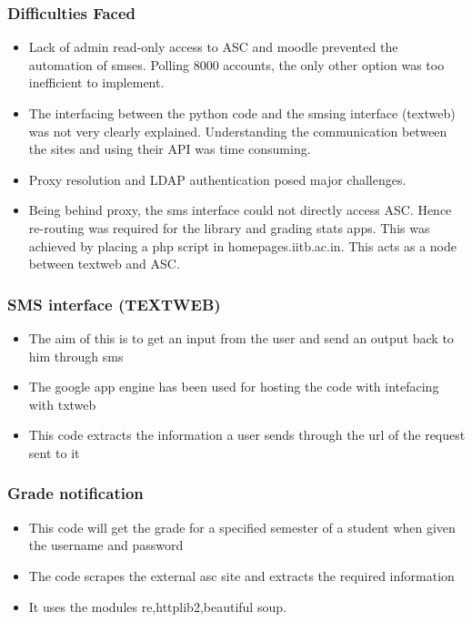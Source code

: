 \documentclass[]{beamer}
\begin{document}
\begin{frame}
	\frametitle{Difficulties Faced}   
  	\begin{itemize}
	\justifying
	\item Lack of admin read-only access to ASC and moodle prevented the automation of smses. Polling 8000 accounts, the only other option was too inefficient to implement.
	\item The interfacing between the python code and the smsing interface (textweb) was not very clearly explained. Understanding the communication between the sites and using their API was time consuming.
	\item Proxy resolution and LDAP authentication posed major challenges.
	\item Being behind proxy, the sms interface could not directly access ASC. Hence re-routing was required for the library and grading stats apps.
This was achieved by placing a php script in homepages.iitb.ac.in. This acts as a node between textweb and ASC.
  	\end{itemize}
\end{frame}

\begin{frame}
	\frametitle{SMS interface (TEXTWEB)}   
  	\begin{itemize}
	\justifying
	\item The aim of this is to get an input from the user and send an output back to him through sms
	\item The google app engine has been used for hosting the code with intefacing with txtweb
	\item This code extracts the information a user sends through the url of the request sent to it

  	\end{itemize}
\end{frame}

\begin{frame}
	\frametitle{Grade notification}   
  	\begin{itemize}
	\justifying
	\item This code will get the grade for a specified semester of a student when given the username and password
	\item The code scrapes the external asc site and extracts the required information 
	\item It uses the modules re,httplib2,beautiful soup. 
	
  	\end{itemize}
\end{frame}
\end{document}
